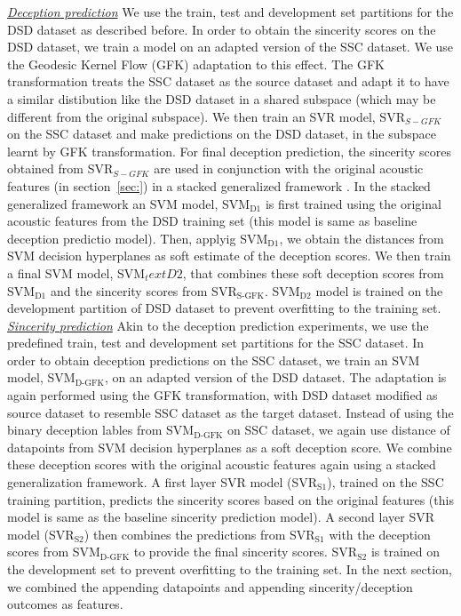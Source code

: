 \documentclass{article}
\begin{document}
\noindent\underline{\it Deception prediction} 
We use the train, test and development set partitions for the DSD dataset as described before.
In order to obtain the sincerity scores on the DSD dataset, we train a model on an adapted version of the SSC dataset.
We use the Geodesic Kernel Flow (GFK) adaptation \cite{} to this effect.
The GFK transformation treats the SSC dataset as the source dataset and adapt it to have a similar distibution like the DSD dataset in a shared subspace (which may be different from the original subspace). 
We then train an SVR model, SVR$_{S-GFK}$ on the SSC dataset and make predictions on the DSD dataset, in the subspace learnt by GFK transformation.
For final deception prediction, the sincerity scores obtained from SVR$_{S-GFK}$ are used in conjunction with the original acoustic features (in section~\ref{sec:}) in a stacked generalized framework \cite{}.
In the stacked generalized framework an SVM model, SVM$_\text{D1}$ is first trained using the original acoustic features from the DSD training set (this model is same as baseline deception predictio model).
Then, applyig SVM$_\text{D1}$, we obtain the distances from SVM decision hyperplanes as soft estimate of the deception scores. 
We then train a final SVM model, SVM$_text{D2}$, that combines these soft deception scores from SVM$_\text{D1}$ and the sincerity scores from SVR$_\text{S-GFK}$.
SVM$_\text{D2}$ model is trained on the development partition of DSD dataset to prevent overfitting to the training set. 
\\

\noindent\underline{\it Sincerity prediction}
Akin to the deception prediction experiments, we use the predefined train, test and development set partitions for the SSC dataset.
In order to obtain deception predictions on the SSC dataset, we train an SVM model, SVM$_\text{D-GFK}$, on an adapted version of the DSD dataset.
The adaptation is again performed using the GFK transformation, with DSD dataset modified as source dataset to resemble SSC dataset as the target dataset.
Instead of using the binary deception lables from SVM$_\text{D-GFK}$ on SSC dataset, we again use distance of datapoints from SVM decision hyperplanes as a soft deception score. 
We combine these deception scores with the original acoustic features again using a stacked generalization framework. 
A first layer SVR model (SVR$_\text{S1}$), trained on the SSC training partition, predicts the sincerity scores based on the original features (this model is same as the baseline sincerity prediction model). 
A second layer SVR model (SVR$_\text{S2}$) then combines the predictions from SVR$_\text{S1}$ with the deception scores from SVM$_\text{D-GFK}$ to provide the final sincerity scores.  
SVR$_\text{S2}$ is trained on the development set to prevent overfitting to the training set. 
In the next section, we combined the appending datapoints and appending sincerity/deception outcomes as features. 
\end{document}
